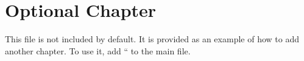 \chapter{Optional Chapter}

This file is not included by default. It is provided as an example of how to add another chapter. To use it, add
``
to the main file.
